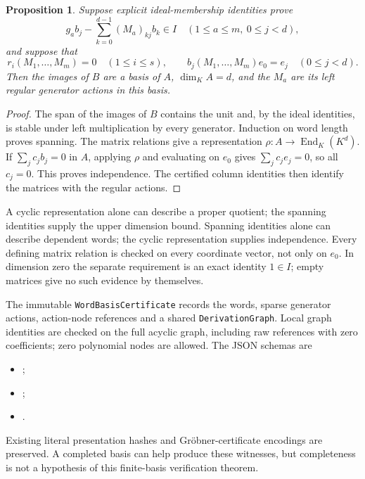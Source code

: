 \documentclass[11pt]{article}
\newtheorem{proposition}{Proposition}
\begin{document}
\begin{proposition}
Suppose explicit ideal-membership identities prove
\[
 g_ab_j-\sum_{k=0}^{d-1}(M_a)_{kj}b_k\in I
 \quad(1\le a\le m,\ 0\le j<d),
\]
and suppose that
\[
 r_i(M_1,\ldots,M_m)=0\quad(1\le i\le s),\qquad
 b_j(M_1,\ldots,M_m)e_0=e_j\quad(0\le j<d).
\]
Then the images of $B$ are a basis of $A$, $\dim_K A=d$, and the $M_a$ are
its left regular generator actions in this basis.
\end{proposition}
\begin{proof}
The span of the images of $B$ contains the unit and, by the ideal identities,
is stable under left multiplication by every generator. Induction on word
length proves spanning. The matrix relations give a representation
$\rho:A\to\operatorname{End}_K(K^d)$. If $\sum_jc_jb_j=0$ in $A$, applying
$\rho$ and evaluating on $e_0$ gives $\sum_jc_je_j=0$, so all $c_j=0$.
This proves independence. The certified column identities then identify the
matrices with the regular actions.
\end{proof}

A cyclic representation alone can describe a proper quotient; the spanning
identities supply the upper dimension bound. Spanning identities alone can
describe dependent words; the cyclic representation supplies independence.
Every defining matrix relation is checked on every coordinate vector, not only
on $e_0$. In dimension zero the separate requirement is an exact identity
$1\in I$; empty matrices give no such evidence by themselves.

The immutable \texttt{WordBasisCertificate} records the words, sparse generator
actions, action-node references and a shared \texttt{DerivationGraph}.
Local graph identities are checked on the full acyclic graph, including raw
references with zero coefficients; zero polynomial nodes are allowed.
The JSON schemas are
\begin{itemize}
\item {};
\item {};
\item {}.
\end{itemize}
Existing literal presentation hashes and Gr\"obner-certificate encodings are
preserved. A completed basis can help produce these witnesses, but completeness
is not a hypothesis of this finite-basis verification theorem.
\end{document}
